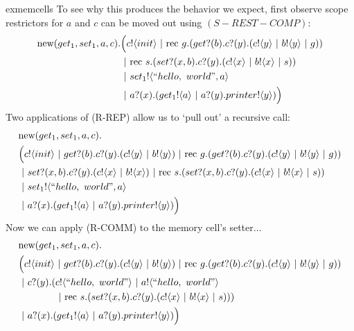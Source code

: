 \begin{example}{exmemcells}
	To see why this produces the behavior we expect, first observe scope restrictors for $a$ and $c$ can be moved out using $(S-REST-COMP)$:
	\begin{equation}\begin{split}
		\text{new}({get_1,set_1,a,c}). & \Big({c}!\langle{init}\rangle \ |\ \text{rec }{g}.({get}?({b}).{c}?({y}).({c}!\langle{y}\rangle\ |\  {b}!\langle{y}\rangle\ |\  g))\\
			&\ |\ \text{rec }{s}.({set}?({x,b}).{c}?({y}).({c}!\langle{x}\rangle\ |\ {b}!\langle{x}\rangle\ |\  s))\\
		&\ |\  {set_1}!\langle{``hello,\ world",a}\rangle\\
		&\ |\  {a}?({x}).({get_1}!\langle{a}\rangle\ |\  {a}?({y}).{printer}!\langle{y}\rangle)\Big)
	\end{split}\end{equation}
	Two applications of (R-REP) allow us to `pull out' a recursive call:
	\begin{equation}\begin{split}
		&\text{new}({get_1,set_1,a,c}).\\
		&\Big({c}!\langle{init}\rangle \ |\ {get}?({b}).{c}?({y}).({c}!\langle{y}\rangle\ |\  {b}!\langle{y}\rangle)\ |\  \text{rec }{g}.({get}?({b}).{c}?({y}).({c}!\langle{y}\rangle\ |\  {b}!\langle{y}\rangle\ |\  g))\\
			&\ |\  {set}?({x,b}).{c}?({y}).({c}!\langle{x}\rangle\ |\ {b}!\langle{x}\rangle)\ |\  \text{rec }{s}.({set}?({x,b}).{c}?({y}).({c}!\langle{x}\rangle\ |\ {b}!\langle{x}\rangle\ |\  s))\\
		&\ |\  {set_1}!\langle{``hello,\ world",a}\rangle\\
		&\ |\  {a}?({x}).({get_1}!\langle{a}\rangle\ |\  {a}?({y}).{printer}!\langle{y}\rangle)\Big)
	\end{split}\end{equation}
	Now we can apply (R-COMM) to the memory cell's setter...
	\begin{equation}\begin{split}
		&\new{get_1,set_1,a,c}\\
		&\Big(\send{c}{init} \comp\receive{get}{b}\receive{c}{y}(\send{c}{y}\comp \send{b}{y})\comp \rec{g}(\receive{get}{b}\receive{c}{y}(\send{c}{y}\comp \send{b}{y}\comp g))\\
			&\begin{split}\comp \receive{c}{y}(&\send{c}{``hello,\ world"}\comp\send{a}{``hello,\ world"} \\
			&\comp \rec{s}(\receive{set}{x,b}\receive{c}{y}(\send{c}{x}\comp\send{b}{x}\comp s)))\end{split}\\
		&\comp \receive{a}{x}(\send{get_1}{a}\comp \receive{a}{y}\send{printer}{y})\Big)

\end{split}
\end{equation}
\end{example}
